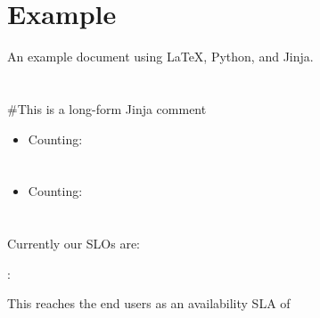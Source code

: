\documentclass{article}
\begin{document}
\section{Example}
An example document using \LaTeX, Python, and Jinja.

\section{}
\#{This is a long-form Jinja comment}
\begin{itemize}
  \item Counting: 
\end{itemize}

\section{}
\begin{itemize}
  \item Counting: 
\end{itemize}

\section{}

Currently our SLOs are:

: \\

This reaches the end users as an availability SLA of 
\end{document}
